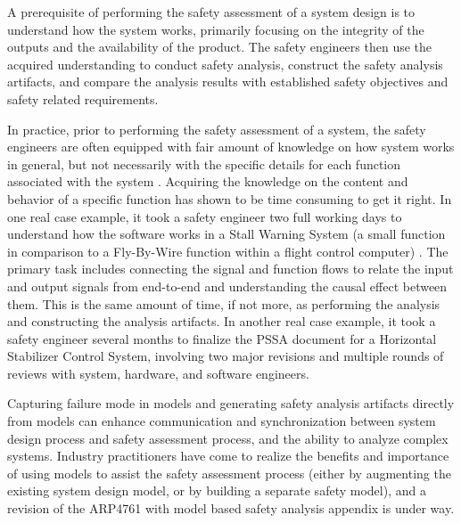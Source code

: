 A prerequisite of performing the safety assessment of a system design is to understand how the system works, primarily focusing on the integrity of the outputs and the availability of the product. The safety engineers then use the acquired understanding to conduct safety analysis, construct the safety analysis artifacts, and compare the analysis results with established safety objectives and safety related requirements.

In practice, prior to performing the safety assessment of a system, the safety engineers are often equipped with fair amount of knowledge on how system works in general, but not necessarily with the specific details for each function associated with the system .  Acquiring the knowledge on the content and behavior of a specific function has shown to be time consuming to get it right. In one real case example, it took a safety engineer two full working days to understand how the software works in a Stall Warning System (a small function in comparison to a Fly-By-Wire function within a flight control computer)  .   The primary task includes connecting the signal and function flows to relate the input and output signals from end-to-end and understanding the causal effect between them. This is the same amount of time, if not more, as performing the analysis and constructing the analysis artifacts. In another real case example, it took a safety engineer several months to finalize the PSSA document for a Horizontal Stabilizer Control System, involving two major revisions and multiple rounds of reviews with system, hardware, and software engineers.

Capturing failure mode in models and generating safety analysis artifacts directly from models can enhance communication and synchronization between system design process and safety assessment process, and the ability to analyze complex systems. Industry practitioners have come to realize the benefits and importance of
using models to assist the safety assessment process (either by augmenting the existing system design model, or by building a separate safety model), and a revision of the ARP4761 with model based safety analysis appendix is under way.

